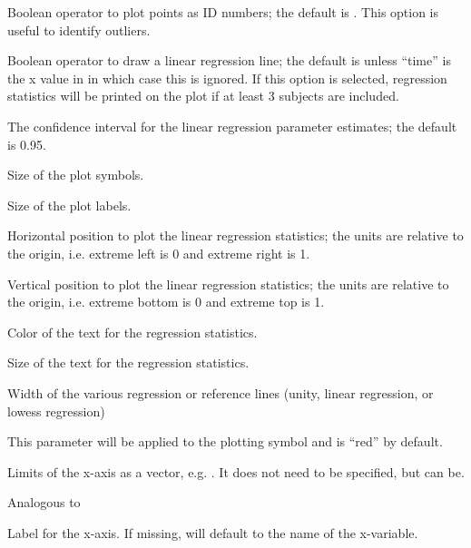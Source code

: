 \documentclass[a4paper]{book}
\begin{document}
\begin{Arguments}
\begin{ldescription}
\item[\code{ident}] Boolean operator to plot points as ID numbers; the default is .
This option is useful to identify outliers.

\item[\code{reg}] Boolean operator to draw a linear regression line; the default is  unless ``time'' is the x value in  in which case this is ignored.
If this option is selected, regression statistics will be printed on the plot if at least 3 subjects are included.

\item[\code{ci}] The confidence interval for the linear regression parameter estimates; the default is 0.95.

\item[\code{cex}] Size of the plot symbols.

\item[\code{cex.lab}] Size of the plot labels.

\item[\code{x.stat}] Horizontal position to plot the linear regression statistics;
the units are relative to the origin, i.e. extreme left is 0 and extreme right is 1.

\item[\code{y.stat}] Vertical position to plot the linear regression statistics; 
the units are relative to the origin, i.e. extreme bottom is 0 and extreme top is 1.

\item[\code{col.stat}] Color of the text for the regression statistics.

\item[\code{cex.stat}] Size of the text for the regression statistics.

\item[\code{lwd}] Width of the various regression or reference lines (unity, linear regression, or
lowess regression)

\item[\code{col}] This parameter will be applied to the plotting symbol and is ``red'' by default.

\item[\code{xlim}] Limits of the x-axis as a vector, e.g. .  It does not need to be specified, but can be.

\item[\code{ylim}] Analogous to 

\item[\code{xlab}] Label for the x-axis.  If missing, will default to the name of the x-variable.


\end{ldescription}
\end{Arguments}
\end{document}
